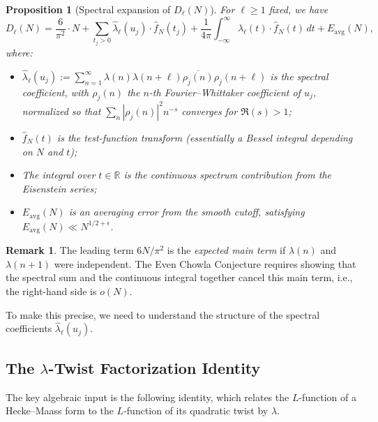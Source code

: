 \documentclass[11pt,a4paper]{article}
\theoremstyle{plain}
\newtheorem{proposition}[theorem]{Proposition}
\theoremstyle{definition}
\newtheorem{remark}[theorem]{Remark}
\newcommand{\RR}{\mathbb{R}}
\begin{document}
\begin{proposition}[Spectral expansion of $D_\ell(N)$]
\label{prop:spectral-expansion}
For $\ell \geq 1$ fixed, we have
\begin{equation}
\label{eq:spectral-expansion}
D_\ell(N) = \frac{6}{\pi^2} \cdot N + \sum_{t_j > 0} \hat{\lambda}_\ell(u_j) \cdot \hat{f}_N(t_j) + \frac{1}{4\pi} \int_{-\infty}^{\infty} \hat{\lambda}_\ell(t) \cdot \hat{f}_N(t) \, dt + E_{\mathrm{avg}}(N),
\end{equation}
where:
\begin{itemize}
\item $\hat{\lambda}_\ell(u_j) := \sum_{n=1}^\infty \lambda(n) \lambda(n+\ell) \overline{\rho_j(n)} \rho_j(n+\ell)$ is the \emph{spectral coefficient}, with $\rho_j(n)$ the $n$-th Fourier--Whittaker coefficient of $u_j$, normalized so that $\sum_n |\rho_j(n)|^2 n^{-s}$ converges for $\Re(s) > 1$;
\item $\hat{f}_N(t)$ is the \emph{test-function transform} (essentially a Bessel integral depending on $N$ and $t$);
\item The integral over $t \in \RR$ is the \emph{continuous spectrum contribution} from the Eisenstein series;
\item $E_{\mathrm{avg}}(N)$ is an averaging error from the smooth cutoff, satisfying $E_{\mathrm{avg}}(N) \ll N^{1/2+\epsilon}$.
\end{itemize}
\end{proposition}

\begin{remark}
The leading term $6N/\pi^2$ is the \emph{expected main term} if $\lambda(n)$ and $\lambda(n+1)$ were independent. The Even Chowla Conjecture requires showing that the spectral sum and the continuous integral together cancel this main term, i.e., the right-hand side is $o(N)$.
\end{remark}

To make this precise, we need to understand the structure of the spectral coefficients $\hat{\lambda}_\ell(u_j)$.

\subsection{The $\lambda$-Twist Factorization Identity}
\label{subsec:factorization}

The key algebraic input is the following identity, which relates the $L$-function of a Hecke--Maass form to the $L$-function of its quadratic twist by $\lambda$.
\end{document}
